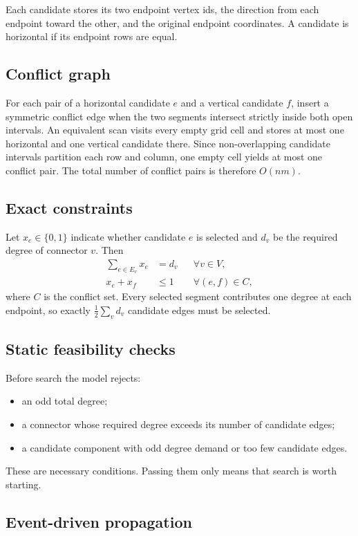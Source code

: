 \documentclass[11pt,a4paper,oneside]{article}
\begin{document}
Each candidate stores its two endpoint vertex ids, the direction from each
endpoint toward the other, and the original endpoint coordinates. A candidate is
horizontal if its endpoint rows are equal.

\subsection{Conflict graph}

For each pair of a horizontal candidate $e$ and a vertical candidate $f$, insert
a symmetric conflict edge when the two segments intersect strictly inside both
open intervals. An equivalent scan visits every empty grid cell and stores at
most one horizontal and one vertical candidate there. Since non-overlapping
candidate intervals partition each row and column, one empty cell yields at most
one conflict pair. The total number of conflict pairs is therefore $O(nm)$.

\subsection{Exact constraints}

Let $x_e\in\{0,1\}$ indicate whether candidate $e$ is selected and $d_v$ be the
required degree of connector $v$. Then
\begin{align}
  \sum_{e\in E_v} x_e &= d_v &&\forall v\in V,\\
  x_e+x_f &\le1 &&\forall(e,f)\in C,
\end{align}
where $C$ is the conflict set. Every selected segment contributes one degree at
each endpoint, so exactly $\frac12\sum_v d_v$ candidate edges must be selected.

\subsection{Static feasibility checks}

Before search the model rejects:
\begin{itemize}
  \item an odd total degree;
  \item a connector whose required degree exceeds its number of candidate edges;
  \item a candidate component with odd degree demand or too few candidate edges.
\end{itemize}
These are necessary conditions. Passing them only means that search is worth
starting.

\subsection{Event-driven propagation}
\end{document}
